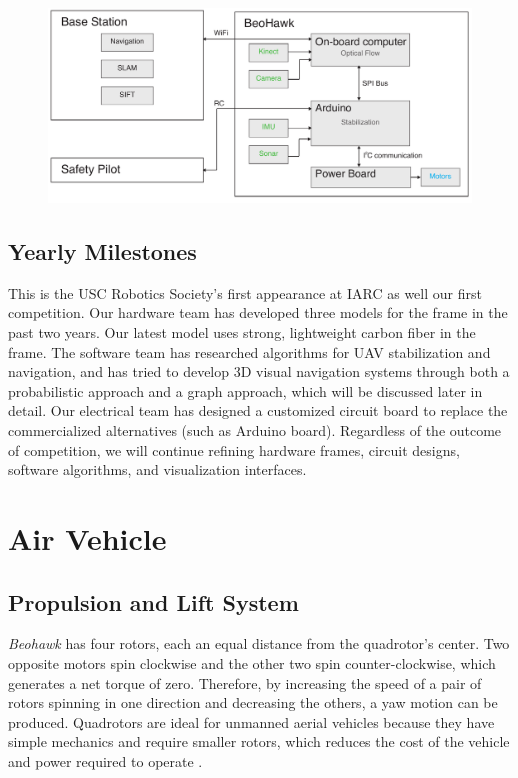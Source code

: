 \documentclass[12pt, letterpaper]{article}
\begin{document}
\begin{figure}[h]
\centering
\includegraphics[width=14cm]{images/beohawk-system-arch.pdf}
\label{fig:arch}
\end{figure}

\subsection{Yearly Milestones}

This is the USC Robotics Society's first appearance at IARC as well our first competition. Our hardware team has developed three models for the frame in the past two years. Our latest model uses strong, lightweight carbon fiber in the frame. The software team has researched algorithms for UAV stabilization and navigation, and has tried to develop 3D visual navigation systems through both a probabilistic approach and a graph approach, which will be discussed later in detail. Our electrical team has designed a customized circuit board to replace the commercialized alternatives (such as Arduino board). Regardless of the outcome of competition, we will continue refining hardware frames, circuit designs, software algorithms, and visualization interfaces.


\section{Air Vehicle}

\subsection{Propulsion and Lift System}
\emph{Beohawk} has four rotors, each an equal distance from the quadrotor's center.  Two opposite motors spin clockwise and the other two spin counter-clockwise, which generates a net torque of zero.  Therefore, by increasing the speed of a pair of rotors spinning in one direction and decreasing the others, a yaw motion can be produced. Quadrotors are ideal for unmanned aerial vehicles because they have simple mechanics and require smaller rotors, which reduces the cost of the vehicle and power required to operate \cite{bib:quadrotor}.
\end{document}
